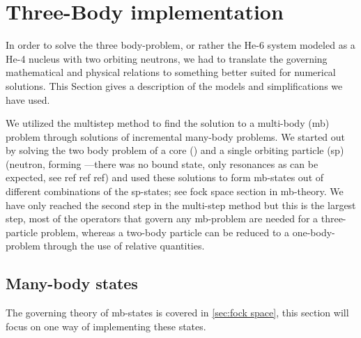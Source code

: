 \section{Three-Body implementation}
In order to solve the three body-problem, or rather the He-6 system 
modeled as a He-4 nucleus with two orbiting neutrons, we had to 
translate the governing mathematical and physical relations to 
something better suited for numerical solutions. This Section gives a description of the models and simplifications we have used.

We utilized the multistep method to find the solution to a 
multi-body (mb) problem through solutions of incremental many-body 
problems. We started out by solving the two body problem of a core 
() and a single orbiting particle (sp) (neutron, forming 
---there was no bound state, only resonances as can be expected, 
see ref ref ref) and used these solutions to form mb-states out of 
different combinations of the sp-states; see fock space section in 
mb-theory. We have only reached the second step in the multi-step 
method but this is the largest step, most of the operators that govern 
any mb-problem are needed for a three-particle problem, whereas a 
two-body particle can be reduced to a one-body-problem through the 
use of relative quantities.
 
\subsection{Many-body states}
The governing theory of mb-states is covered in \cref{sec:fock space}, this section will focus on one way of implementing these states.

